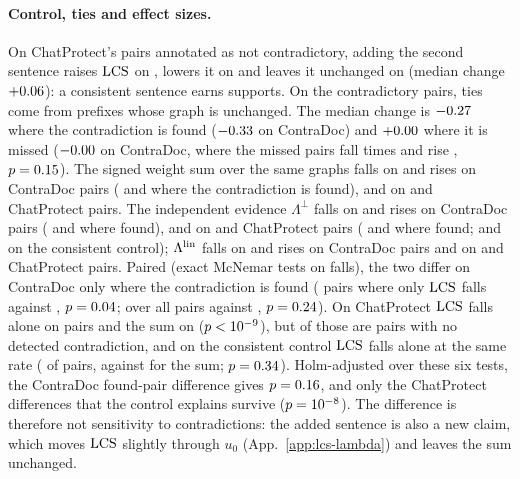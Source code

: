 \paragraph{Control, ties and effect sizes.} On ChatProtect's \extCpCtlNGpt{} pairs annotated as not
contradictory, adding the second sentence raises $\mathrm{LCS}$ on \extCpCtlIncGpt{}, lowers it on
\extCpCtlDecGpt{} and leaves it unchanged on \extCpCtlTieGpt{} (median change
$+0.06$): a consistent sentence earns supports. On the \extCpAssertNGpt{}
contradictory pairs, \extCpAssertTieGpt{} ties come from prefixes whose graph is unchanged. The
median change is $-0.27$ where the contradiction is found
($-0.33$ on ContraDoc) and $+0.00$ where it is missed
($-0.00$ on ContraDoc, where the missed pairs fall \extCdAssertNotFoundDecGpt{}
times and rise \extCdAssertNotFoundIncGpt{}, $p=0.15$). The signed weight sum
over the same graphs falls on \extCdWsumDecGpt{} and rises on \extCdWsumIncGpt{} ContraDoc pairs
(\extCdWsumEdgeDecGpt{} and \extCdWsumEdgeIncGpt{} where the contradiction is found), and on
\extCpWsumDecGpt{} and \extCpWsumIncGpt{} ChatProtect pairs. The independent evidence
$\Lambda^{\perp}$ falls on \extCdIndepDecGpt{} and rises on \extCdIndepIncGpt{} ContraDoc pairs
(\extCdIndepEdgeDecGpt{} and \extCdIndepEdgeIncGpt{} where found), and on \extCpIndepDecGpt{} and
\extCpIndepIncGpt{} ChatProtect pairs (\extCpIndepFoundDecGpt{} and \extCpIndepFoundIncGpt{} where
found; \extCpIndepCtlDecGpt{} and \extCpIndepCtlIncGpt{} on the consistent control); $\Lambda^{\mathrm{lin}}$ falls on
\extCdLinDecGpt{} and rises on \extCdLinIncGpt{} ContraDoc pairs and on \extCpLinDecGpt{} and
\extCpLinIncGpt{} ChatProtect pairs. Paired (exact McNemar tests on falls), the
two differ on ContraDoc only where the contradiction is found (\extCdMcFoundOnlyLcsGpt{} pairs where
only $\mathrm{LCS}$ falls against \extCdMcFoundOnlySumGpt{}, $p=0.04$; over all pairs
\extCdMcAllOnlyLcsGpt{} against \extCdMcAllOnlySumGpt, $p=0.24$). On ChatProtect $\mathrm{LCS}$ falls
alone on \extCpMcAllOnlyLcsGpt{} pairs and the sum on \extCpMcAllOnlySumGpt{} ($p<10^{-9}$), but
\extCpMcNotFoundOnlyLcsGpt{} of those are pairs with no detected contradiction, and on the consistent
control $\mathrm{LCS}$ falls alone at the same rate (\extCpMcCtlOnlyLcsGpt{} of \extCpCtlNGpt{} pairs, against
\extCpMcCtlOnlySumGpt{} for the sum; $p=0.34$). Holm-adjusted over these six tests, the
ContraDoc found-pair difference gives $p=0.16$, and only the ChatProtect differences
that the control explains survive ($p=10^{-8}$). The difference is therefore not sensitivity
to contradictions: the added sentence is also a new claim, which moves $\mathrm{LCS}$ slightly through
$u_0$ (App.~\ref{app:lcs-lambda}) and leaves the sum unchanged.


